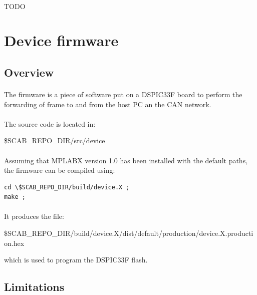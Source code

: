 \documentclass[a4paper, 11pt]{article}
\begin{document}
\paragraph{}
TODO

\newpage
\section{Device firmware}

\subsection{Overview}
\paragraph{}
The firmware is a piece of software put on a DSPIC33F board to perform the forwarding
of frame to and from the host PC an the CAN network.

\paragraph{}
The source code is located in:
\begin{center}
\$SCAB\_REPO\_DIR/src/device
\end{center}

\paragraph{}
Assuming that MPLABX version 1.0 has been installed with the default paths, the firmware
can be compiled using:\\
\begin{small}
\lstset{language=C}
\begin{lstlisting}[frame=tb]
cd \$SCAB_REPO_DIR/build/device.X ;
make ;
\end{lstlisting}
\end{small}

\paragraph{}
It produces the file:
\begin{center}
\$SCAB\_REPO\_DIR/build/device.X/dist/default/production/device.X.production.hex
\end{center}
which is used to program the DSPIC33F flash.

\subsection{Limitations}
\end{document}
